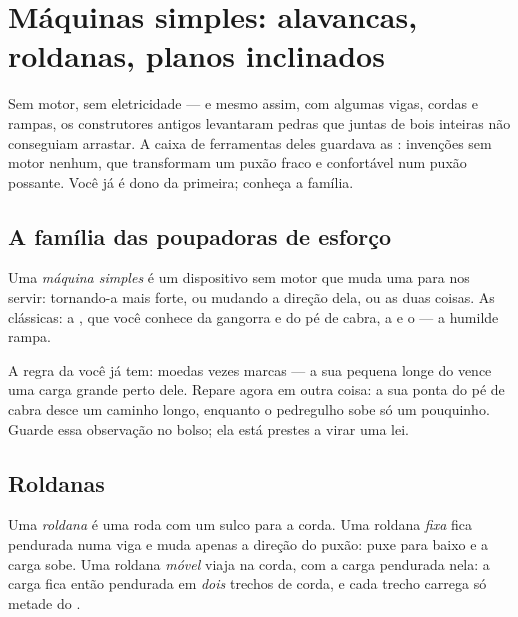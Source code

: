 \chapter{Máquinas simples: alavancas, roldanas, planos inclinados}\label{ch:g5:simple-machines}

Sem motor, sem eletricidade --- e mesmo assim, com algumas vigas,
cordas e rampas, os construtores antigos levantaram pedras que juntas
de bois inteiras não conseguiam arrastar. A caixa de ferramentas
deles guardava as \emph{}: invenções sem motor
nenhum, que transformam um puxão fraco e confortável num puxão
possante. Você já é dono da primeira; conheça a família.

\section{A família das poupadoras de esforço}

\begin{definition}\label{def:g5:simple-machines:machine}
Uma \emph{máquina simples} é um dispositivo
sem motor que muda uma  para nos servir: tornando-a mais forte,
ou mudando a direção dela, ou as duas coisas. As clássicas: a
\emph{}, que você conhece da gangorra e do pé de cabra, a
\emph{} e o \emph{} --- a humilde rampa.
\end{definition}

\begin{example}\label{ex:g5:simple-machines:lever}
A regra da  você já tem: moedas vezes marcas --- a sua 
pequena longe do  vence uma carga grande perto dele.
Repare agora em outra coisa: a sua ponta do pé de cabra desce um
caminho longo, enquanto o pedregulho sobe só um pouquinho. Guarde
essa observação no bolso; ela está prestes a virar uma lei.
\end{example}

\section{Roldanas}

\begin{definition}[Roldana]\label{def:g5:simple-machines:pulley}
Uma \emph{roldana} é uma roda com um sulco para a
corda. Uma roldana \emph{fixa} fica pendurada numa viga e muda apenas
a direção do puxão: puxe para baixo e a carga sobe. Uma roldana
\emph{móvel} viaja na corda, com a carga pendurada nela: a carga fica
então pendurada em \emph{dois} trechos de corda, e cada trecho
carrega só metade do .
\end{definition}

